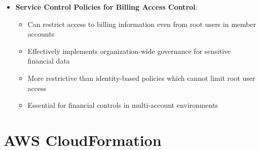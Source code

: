 \documentclass[11pt,a4paper]{report}
\begin{document}
\begin{itemize}
\begin{itemize}
  \item More manageable than using the same root email for all accounts, which complicates account management
  \item Particularly important for accounts managing critical infrastructure or sensitive data
  \item Distribution lists should be limited to administrators who need the information to maintain security
  \item When combined with proper IAM user setup for day-to-day operations, creates a comprehensive account governance system
\end{itemize}
  \item \textbf{Service Control Policies for Billing Access Control}:
\begin{itemize}
  \item Can restrict access to billing information even from root users in member accounts
  \item Effectively implements organization-wide governance for sensitive financial data
  \item More restrictive than identity-based policies which cannot limit root user access
  \item Essential for financial controls in multi-account environments
\end{itemize}
\end{itemize}


\section{AWS CloudFormation}
\end{document}
